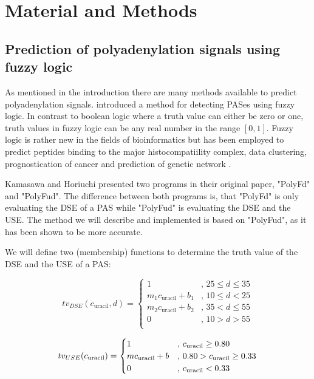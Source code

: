 \section{Material and Methods}


\subsection{Prediction of polyadenylation signals using fuzzy logic}
As mentioned in the introduction there are many methods available to predict polyadenylation signals. \citeauthor{pmid19393560} introduced a method for detecting PASes using fuzzy logic. In contrast to boolean logic where a truth value can either be zero or one, truth values in fuzzy logic can be any real number in the range $[0,1]$. Fuzzy logic is rather new in the fields of bioinformatics but has been employed to predict peptides binding to the major histocompatiility complex, data clustering, prognostication of cancer and prediction of genetic network . 

Kamasawa and Horiuchi presented two programs in their original paper, "PolyFd" and "PolyFud". The difference between both programs is, that "PolyFd" is only evaluating the DSE of a PAS while "PolyFud" is evaluating the DSE and the USE. The method we will describe and implemented is based on "PolyFud", as it has been shown to be more accurate.

We will define two (membership) functions to determine the truth value of the DSE and the USE of a PAS:

\begin{equation*}
	tv_{DSE}(c_{\text{uracil}}, d)=
  \begin{cases}
	  1 & \text{, $25 \leq d \leq 35$} \\
	  m_{1}c_{\text{uracil}} + b_{1} & \text{, $10 \leq d < 25$} \\
	  m_{2}c_{\text{uracil}} + b_{2} & \text{, $35< d \leq 55$} \\
	  0 & \text{, $10 > d > 55$} \\
  \end{cases}
\end{equation*}


\begin{equation*}
	tv_{USE}(c_{\text{uracil}})=
  \begin{cases}
	  1 & \text{, $c_{\text{uracil}} \geq 0.80$} \\
	  mc_{\text{uracil}} + b & \text{, $ 0.80 > c_{\text{uracil}} \geq 0.33$} \\
	  0 & \text{, $c_{\text{uracil}} < 0.33$} \\
  \end{cases}
\end{equation*}

